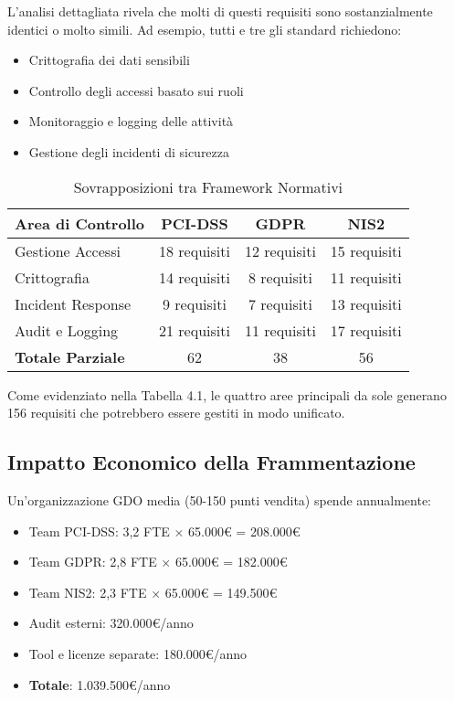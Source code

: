 L'analisi dettagliata rivela che molti di questi requisiti sono sostanzialmente identici o molto simili. Ad esempio, tutti e tre gli standard richiedono:
\begin{itemize}
\item Crittografia dei dati sensibili
\item Controllo degli accessi basato sui ruoli
\item Monitoraggio e logging delle attività
\item Gestione degli incidenti di sicurezza
\end{itemize}

\begin{table}[h]
\centering
\caption{Sovrapposizioni tra Framework Normativi}
\begin{tabular}{|l|c|c|c|}
\hline
\textbf{Area di Controllo} & \textbf{PCI-DSS} & \textbf{GDPR} & \textbf{NIS2} \\
\hline
Gestione Accessi & 18 requisiti & 12 requisiti & 15 requisiti \\
Crittografia & 14 requisiti & 8 requisiti & 11 requisiti \\
Incident Response & 9 requisiti & 7 requisiti & 13 requisiti \\
Audit e Logging & 21 requisiti & 11 requisiti & 17 requisiti \\
\hline
\textbf{Totale Parziale} & 62 & 38 & 56 \\
\hline
\end{tabular}
\end{table}

Come evidenziato nella Tabella 4.1, le quattro aree principali da sole generano 156 requisiti che potrebbero essere gestiti in modo unificato.

\subsection{Impatto Economico della Frammentazione}

Un'organizzazione GDO media (50-150 punti vendita) spende annualmente:
\begin{itemize}
\item Team PCI-DSS: 3,2 FTE × 65.000€ = 208.000€
\item Team GDPR: 2,8 FTE × 65.000€ = 182.000€  
\item Team NIS2: 2,3 FTE × 65.000€ = 149.500€
\item Audit esterni: 320.000€/anno
\item Tool e licenze separate: 180.000€/anno
\item \textbf{Totale}: 1.039.500€/anno
\end{itemize}


